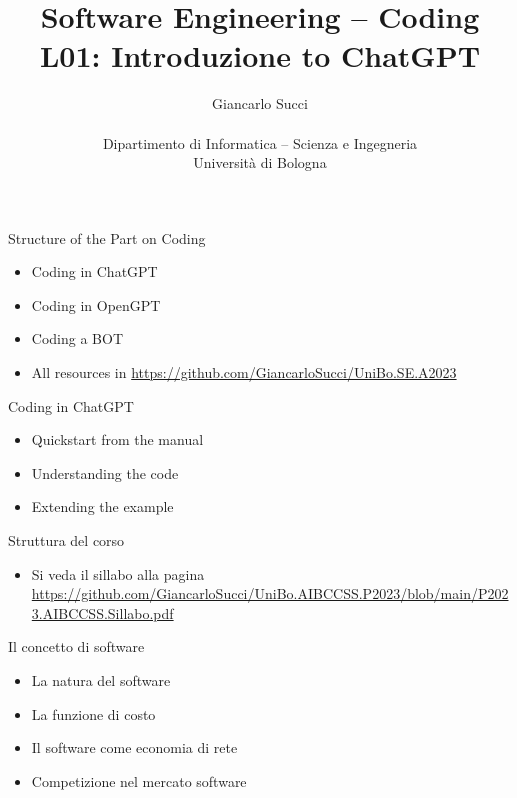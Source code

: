\documentclass{beamer}
\title[L01]{Software Engineering -- Coding\newline\newline
 L01: Introduzione to ChatGPT} %
\author[{\tiny Giancarlo Succi }]{Giancarlo Succi\\\\ Dipartimento di Informatica -- Scienza e Ingegneria\\Universit\`{a} di Bologna\\
\bftt{g.succi@unibo.it}
} %
\institute[unibo] %
\date{} %
\begin{document}
\begin{frame}
\titlepage %

\end{frame}




\begin{frame}
{\centerline{Structure of the Part on Coding}}
\begin{itemize}
    \item Coding in ChatGPT
    \item Coding in OpenGPT
    \item Coding a BOT
    \item All resources in  \url{https://github.com/GiancarloSucci/UniBo.SE.A2023}
\end{itemize} 
\end{frame}

\begin{frame}
{\centerline{Coding in ChatGPT}}
\begin{itemize}
    \item Quickstart from the manual
    \item Understanding the code
    \item Extending the example
\end{itemize} 
\end{frame}

\begin{frame}
{\centerline{Struttura del corso}}
\begin{itemize}
    \item Si veda il sillabo alla pagina \url{https://github.com/GiancarloSucci/UniBo.AIBCCSS.P2023/blob/main/P2023.AIBCCSS.Sillabo.pdf}
\end{itemize} 
\end{frame}


\begin{frame}
{\centerline{Il concetto di software}}
\begin{itemize}
    \item La natura del software
    \item La funzione di costo
    \item Il software come economia di rete 
    \item Competizione nel mercato software
\end{itemize} 
\end{frame}
\end{document}

